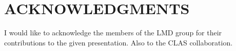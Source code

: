 \documentclass{aip-cp}
\begin{document}
\section{ACKNOWLEDGMENTS}
I would like to acknowledge the members of the LMD group for their contributions to the given presentation. Also to the CLAS collaboration.


\nocite{*}
%
%
\end{document}

